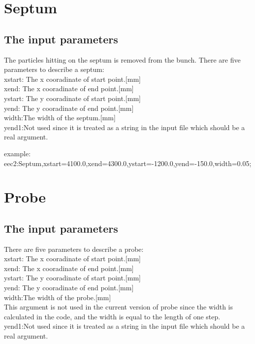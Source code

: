 \documentclass{article}
\begin{document}
\section{Septum}
\subsection{The input parameters}
The particles hitting on the septum is removed from the bunch. There are five parameters to describe a septum:\\
xstart: The x cooradinate of start point.[mm]\\
xend: The x cooradinate of end point.[mm]\\
ystart: The y cooradinate of start point.[mm]\\
yend: The y cooradinate of end point.[mm]\\
width:The width of the septum.[mm]\\
yend1:Not used since it is treated as a string in the input file which should be a real argument.

example:
eec2:Septum,xstart=4100.0,xend=4300.0,ystart=-1200.0,yend=-150.0,width=0.05;



\section{Probe}
\subsection{The input parameters}

There are five parameters to describe a probe:\\
xstart: The x cooradinate of start point.[mm]\\
xend: The x cooradinate of end point.[mm]\\
ystart: The y cooradinate of start point.[mm]\\
yend: The y cooradinate of end point.[mm]\\
width:The width of the probe.[mm] \\
This argument is not used in the current version of probe since
the width is calculated in the code, and the width is equal to the length of one step.\\
yend1:Not used since it is treated as a string in the input file which should be a real argument.
\end{document}

